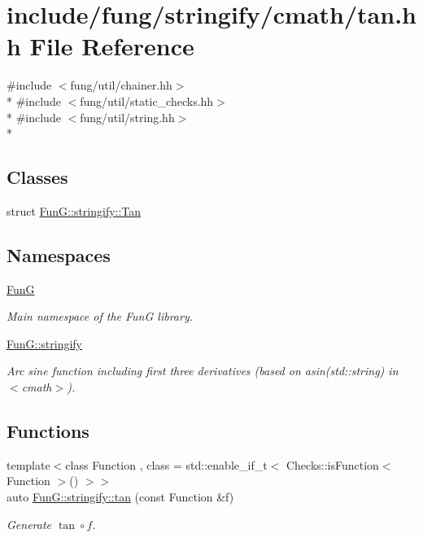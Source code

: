 \hypertarget{stringify_2cmath_2tan_8hh}{\section{include/fung/stringify/cmath/tan.hh File Reference}
\label{stringify_2cmath_2tan_8hh}
}
{\ttfamily \#include $<$fung/util/chainer.\-hh$>$}\\*
{\ttfamily \#include $<$fung/util/static\-\_\-checks.\-hh$>$}\\*
{\ttfamily \#include $<$fung/util/string.\-hh$>$}\\*
\subsection*{Classes}
\begin{DoxyCompactItemize}
\item 
struct \hyperlink{structFunG_1_1stringify_1_1Tan}{Fun\-G\-::stringify\-::\-Tan}
\end{DoxyCompactItemize}
\subsection*{Namespaces}
\begin{DoxyCompactItemize}
\item 
\hyperlink{namespaceFunG}{Fun\-G}
\begin{DoxyCompactList}\small\item\em Main namespace of the Fun\-G library. \end{DoxyCompactList}\item 
\hyperlink{namespaceFunG_1_1stringify}{Fun\-G\-::stringify}
\begin{DoxyCompactList}\small\item\em Arc sine function including first three derivatives (based on asin(std\-::string) in $<$cmath$>$). \end{DoxyCompactList}\end{DoxyCompactItemize}
\subsection*{Functions}
\begin{DoxyCompactItemize}
\item 
{\footnotesize template$<$class Function , class  = std\-::enable\-\_\-if\-\_\-t$<$ Checks\-::is\-Function$<$ Function $>$() $>$$>$ }\\auto \hyperlink{namespaceFunG_1_1stringify_a85e04af673887eb29a630918c8b660ed}{Fun\-G\-::stringify\-::tan} (const Function \&f)
\begin{DoxyCompactList}\small\item\em Generate $ \tan\circ f $. \end{DoxyCompactList}\end{DoxyCompactItemize}
